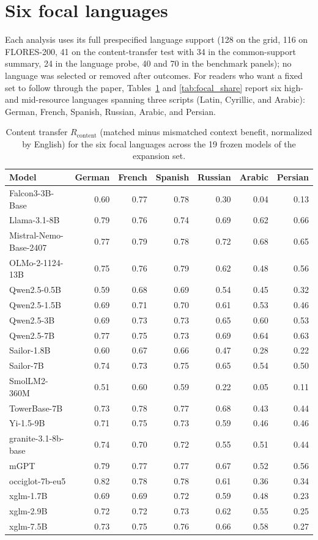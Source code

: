 \documentclass{article} %
\begin{document}
\section{Six focal languages}
\label{app:focal}
Each analysis uses its full prespecified language support (128 on the grid, 116 on FLORES-200, 41 on the content-transfer test with 34 in the common-support summary, 24 in the language probe, 40 and 70 in the benchmark panels); no language was selected or removed after outcomes. For readers who want a fixed set to follow through the
paper, Tables~\ref{tab:focal_rcontent} and \ref{tab:focal_share} report six
high- and mid-resource languages spanning three scripts (Latin, Cyrillic, and Arabic): German, French,
Spanish, Russian, Arabic, and Persian.
\begin{table}[h]\caption{Content transfer $R_{\mathrm{content}}$ (matched minus mismatched context benefit, normalized by English) for the six focal languages across the 19 frozen models of the expansion set.}\label{tab:focal_rcontent}
\begin{center}\scriptsize
\begin{tabular}{lrrrrrr}
\toprule
Model & German & French & Spanish & Russian & Arabic & Persian \\
\midrule
Falcon3-3B-Base & 0.60 & 0.77 & 0.78 & 0.30 & 0.04 & 0.13 \\
Llama-3.1-8B & 0.79 & 0.76 & 0.74 & 0.69 & 0.62 & 0.66 \\
Mistral-Nemo-Base-2407 & 0.77 & 0.79 & 0.78 & 0.72 & 0.68 & 0.65 \\
OLMo-2-1124-13B & 0.75 & 0.76 & 0.79 & 0.62 & 0.48 & 0.56 \\
Qwen2.5-0.5B & 0.59 & 0.68 & 0.69 & 0.54 & 0.45 & 0.32 \\
Qwen2.5-1.5B & 0.69 & 0.71 & 0.70 & 0.61 & 0.53 & 0.46 \\
Qwen2.5-3B & 0.69 & 0.73 & 0.73 & 0.65 & 0.60 & 0.53 \\
Qwen2.5-7B & 0.77 & 0.75 & 0.73 & 0.69 & 0.64 & 0.63 \\
Sailor-1.8B & 0.60 & 0.67 & 0.66 & 0.47 & 0.28 & 0.22 \\
Sailor-7B & 0.74 & 0.73 & 0.75 & 0.65 & 0.54 & 0.50 \\
SmolLM2-360M & 0.51 & 0.60 & 0.59 & 0.22 & 0.05 & 0.11 \\
TowerBase-7B & 0.73 & 0.78 & 0.77 & 0.68 & 0.43 & 0.44 \\
Yi-1.5-9B & 0.71 & 0.75 & 0.73 & 0.59 & 0.46 & 0.46 \\
granite-3.1-8b-base & 0.74 & 0.70 & 0.72 & 0.55 & 0.51 & 0.44 \\
mGPT & 0.79 & 0.77 & 0.77 & 0.67 & 0.52 & 0.56 \\
occiglot-7b-eu5 & 0.82 & 0.78 & 0.78 & 0.61 & 0.36 & 0.34 \\
xglm-1.7B & 0.69 & 0.69 & 0.72 & 0.59 & 0.48 & 0.23 \\
xglm-2.9B & 0.72 & 0.72 & 0.73 & 0.62 & 0.55 & 0.25 \\
xglm-7.5B & 0.73 & 0.75 & 0.76 & 0.66 & 0.58 & 0.27 \\
\bottomrule
\end{tabular}
\end{center}


\end{table}
\end{document}
